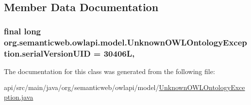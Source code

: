 \subsection{Member Data Documentation}
\hypertarget{classorg_1_1semanticweb_1_1owlapi_1_1model_1_1_unknown_o_w_l_ontology_exception_aaf6e0b84d85f9ba46bb02b6161eb9a86}{
\subsubsection[{serial\-Version\-U\-I\-D}]{\setlength{\rightskip}{0pt plus 5cm}final long org.\-semanticweb.\-owlapi.\-model.\-Unknown\-O\-W\-L\-Ontology\-Exception.\-serial\-Version\-U\-I\-D = 30406\-L\hspace{0.3cm}{\ttfamily [static]}, {\ttfamily [private]}}}\label{classorg_1_1semanticweb_1_1owlapi_1_1model_1_1_unknown_o_w_l_ontology_exception_aaf6e0b84d85f9ba46bb02b6161eb9a86}


The documentation for this class was generated from the following file\-:\begin{DoxyCompactItemize}
\item 
api/src/main/java/org/semanticweb/owlapi/model/\hyperlink{_unknown_o_w_l_ontology_exception_8java}{Unknown\-O\-W\-L\-Ontology\-Exception.\-java}\end{DoxyCompactItemize}
